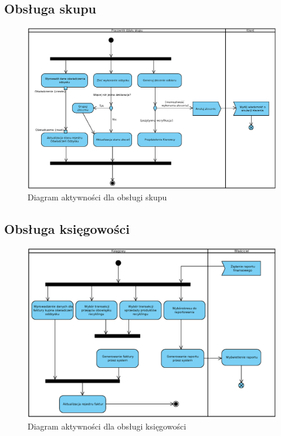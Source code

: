 \subsection{Obsługa skupu}
	\begin{figure}[H]
		\centering
		\centerline{\includegraphics[width=1.2\textwidth]{img/AD/skup.eps}}
		\caption{Diagram aktywności dla obsługi skupu}
	\end{figure}

\subsection{Obsługa księgowości}
	\begin{figure}[H]
		\centering
		\centerline{\includegraphics[width=1.2\textwidth]{img/AD/ksiegowosc.eps}}
		\caption{Diagram aktywności dla obsługi księgowości}
	\end{figure}


